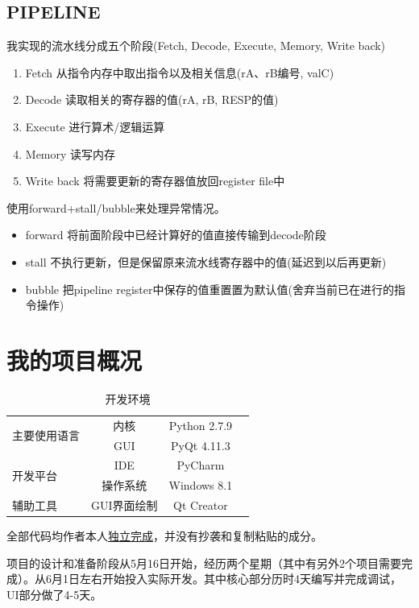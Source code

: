 \documentclass{article}
\begin{document}
\subsection{PIPELINE}
我实现的流水线分成五个阶段(Fetch, Decode, Execute, Memory, Write back)
\begin{enumerate}
\item Fetch      从指令内存中取出指令以及相关信息(rA、rB编号, valC)
\item Decode     读取相关的寄存器的值(rA, rB, RESP的值)
\item Execute    进行算术/逻辑运算
\item Memory     读写内存
\item Write back 将需要更新的寄存器值放回register file中
\end{enumerate}

使用forward+stall/bubble来处理异常情况。
\begin{itemize}
\item forward 将前面阶段中已经计算好的值直接传输到decode阶段
\item stall 不执行更新，但是保留原来流水线寄存器中的值(延迟到以后再更新)
\item bubble 把pipeline register中保存的值重置置为默认值(舍弃当前已在进行的指令操作)
\end{itemize}
\section{我的项目概况}
\begin{center}
\begin{table}[!ht]     %
\centering
\caption{开发环境}
\begin{tabular}{|l|c|c|c|}
\hline
\multirow{2}{*}{主要使用语言} & 内核 & Python 2.7.9\\
\cline{2-3}
 & GUI & PyQt 4.11.3\\
\hline
\multirow{2}{*}{开发平台} & IDE & PyCharm\\
\cline{2-3}
& 操作系统 & Windows 8.1\\
\hline
辅助工具 & GUI界面绘制 & Qt Creator\\
\hline
\end{tabular}
\end{table}
\end{center}

全部代码均作者本人\underline{独立完成}，并没有抄袭和复制粘贴的成分。

项目的设计和准备阶段从5月16日开始，经历两个星期（其中有另外2个项目需要完成）。从6月1日左右开始投入实际开发。其中核心部分历时4天编写并完成调试，UI部分做了4-5天。
\end{document}
